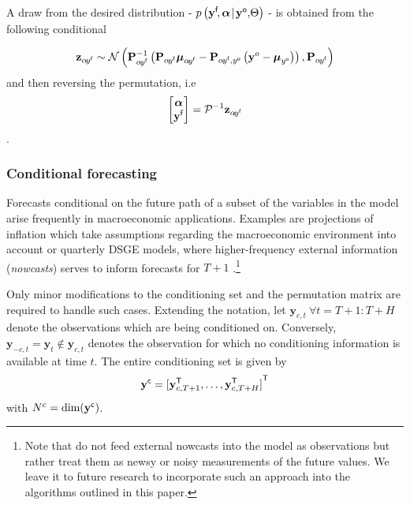\documentclass[notitlepage,a4paper,12pt]{article}
\newcommand{\transpose}[1]{{#1}^{\sf{T}}}
\begin{document}
A draw from the desired distribution - $p\left(\mathbf{y}^{\sf{f}}\!,\boldsymbol{\alpha}\!\mid\! \mathbf{y}^{\sf{o}},\!\Theta \right)$ - is obtained from the following conditional 

\begin{equation*}
    \mathbf{z}_{\alpha\! y^{\sf{f}}} \sim 
    \mathcal{N}\left(
        \mathbf{P}^{-1}_{\alpha\! y^{\sf{f}}}\left( \mathbf{P}_{\alpha\! y^{\sf{f}}}\boldsymbol{\mu}_{\alpha\! y^{\sf{f}}} - \mathbf{P}_{\alpha\! y^{\sf{f}}, y^{\sf{o}}}\left(\mathbf{y}^o-\boldsymbol{\mu}_{y^{\sf{o}}}\right)\right)
    ,
    \mathbf{P}_{\alpha\! y^{\sf{f}}}
    \right)
\end{equation*}
and then reversing the permutation, i.e 
$$
\begin{bmatrix}
    \boldsymbol{\alpha} \\
    \mathbf{y^{\sf{f}}}
\end{bmatrix}
= 
\mathcal{P}^{-1} \mathbf{z}_{\alpha\! y^{\sf{f}}}
$$.

\subsubsection{Conditional forecasting}\label{sec:condfcast}

Forecasts conditional on the future path of a subset of the variables in the model arise frequently in macroeconomic applications. Examples are projections of inflation which take assumptions regarding the macroeconomic environment into account \citep{giannone_etal_2014_ijf} or quarterly DSGE models, where higher-frequency external information (\textit{nowcasts}) serves to inform forecasts for $T+1$ \citep{delnegro_schorfheide_2013_hb}.\footnote{Note that \citet{delnegro_schorfheide_2013_hb} do not feed external nowcasts into the model as observations but rather treat them as newsy or noisy measurements of the future values. We leave it to future research to incorporate such an approach into the algorithms outlined in this paper.}

Only minor modifications to the conditioning set and the permutation matrix are required to handle such cases. Extending the notation, let $\mathbf{y}_{c,t}\: \forall t = T+1:T+H$ denote the observations which are being conditioned on. Conversely, $\mathbf{y}_{-c,t} = \mathbf{y}_t\notin\mathbf{y}_{c,t}$ denotes the observation for which no conditioning information is available at time $t$. The entire conditioning set is given by 
$$
\mathbf{y}^{\sf{c}} = \transpose{[\mathbf{y}^{\sf{T}}_{c,T+1}, \dots, \mathbf{y}^{\sf{T}}_{c,T+H}]}
$$ 
with $N^c = \text{dim}(\mathbf{y}^{\sf{c}})$.
\end{document}
